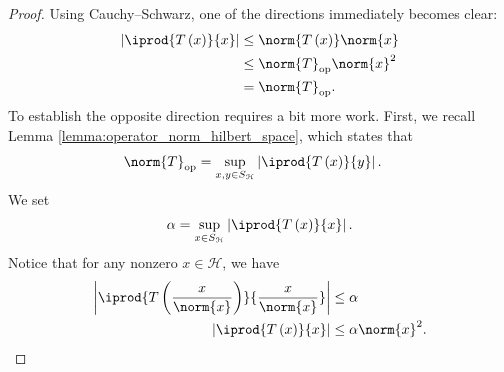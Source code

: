 \begin{proof}
  Using Cauchy--Schwarz, one of the directions immediately becomes clear:
  \begin{align*}
    \left\vert \iprod{T\left( x \right)}{x} \right\vert &\leq \norm{T\left( x \right)}\norm{x}\\
                                                        &\leq \norm{T}_{\op}\norm{x}^2\\
                                                        &= \norm{T}_{\op}.
  \end{align*}
  To establish the opposite direction requires a bit more work. First, we recall Lemma \ref{lemma:operator_norm_hilbert_space}, which states that
  \begin{align*}
    \norm{T}_{\op} &= \sup_{x,y\in S_{\mathcal{H}}}\left\vert \iprod{T\left( x \right)}{y} \right\vert.
  \end{align*}
  We set 
  \begin{align*}
    \alpha = \sup_{x\in S_{\mathcal{H}}} \left\vert \iprod{T\left( x \right)}{x} \right\vert.
  \end{align*}
  Notice that for any nonzero $x\in \mathcal{H}$, we have
  \begin{align*}
    \left\vert \iprod{T\left( \frac{x}{\norm{x}} \right)}{\frac{x}{\norm{x}}} \right\vert &\leq \alpha\\
    \left\vert \iprod{T\left( x \right)}{x} \right\vert &\leq \alpha \norm{x}^2.
  \end{align*}
  

\end{proof}
